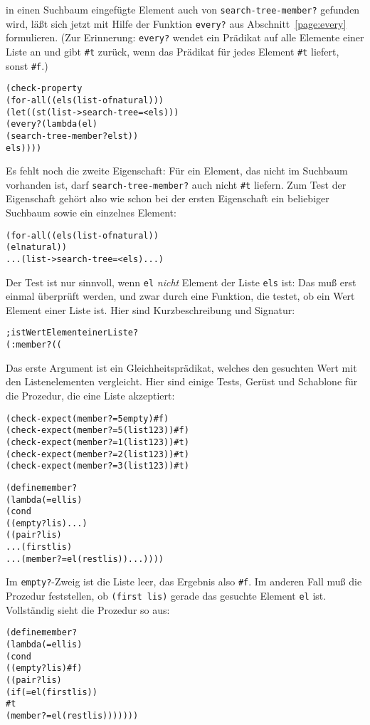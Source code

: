 in einen Suchbaum eingefügte Element auch von
\texttt{search-tree-member?} gefunden wird, läßt sich jetzt mit Hilfe
der Funktion \texttt{every?} aus Abschnitt~\ref{page:every}
formulieren.  (Zur Erinnerung: \texttt{every?} wendet ein Prädikat auf
alle Elemente einer Liste an und gibt \verb|#t| zurück, wenn das
Prädikat für jedes Element \verb|#t| liefert, sonst \verb|#f|.)
%
\begin{alltt}
(check-property
 (for-all ((els (list-of natural)))
   (let ((st (list->search-tree = < els)))
     (every? (lambda (el)
               (search-tree-member? el st))
             els))))
\end{alltt}
%
Es fehlt noch die zweite Eigenschaft: Für ein Element, das nicht im
Suchbaum vorhanden ist, darf \texttt{search-tree-member?} auch nicht
\verb|#t| liefern.  Zum Test der Eigenschaft gehört also wie schon bei
der ersten Eigenschaft ein beliebiger Suchbaum sowie ein einzelnes Element:
%
\begin{alltt}
(for-all ((els (list-of natural))
          (el natural))
  ... (list->search-tree = < els) ...)
\end{alltt}
%
Der Test ist nur sinnvoll, wenn \texttt{el} \emph{nicht} Element der Liste
\texttt{els} ist: Das muß erst einmal überprüft werden, und zwar durch
eine Funktion, die testet, ob ein Wert Element einer Liste ist.  Hier
sind Kurzbeschreibung und Signatur:
%
\begin{alltt}
; ist Wert Element einer Liste?
(: member? ((%a %a -> boolean) %a (list-of %a) -> boolean))
\end{alltt}
%
Das erste Argument ist ein Gleichheitsprädikat, welches den gesuchten
Wert mit den Listenelementen vergleicht.  Hier sind einige Tests,
Gerüst und Schablone für die Prozedur, die eine Liste akzeptiert:
%
\begin{alltt}
(check-expect (member? = 5 empty) #f)
(check-expect (member? = 5 (list 1 2 3)) #f)
(check-expect (member? = 1 (list 1 2 3)) #t)
(check-expect (member? = 2 (list 1 2 3)) #t)
(check-expect (member? = 3 (list 1 2 3)) #t)

(define member?
  (lambda (= el lis)
    (cond
      ((empty? lis) ...)
      ((pair? lis)
       ... (first lis)
       ... (member? = el (rest lis)) ...))))
\end{alltt}
%
Im \texttt{empty?}-Zweig ist die Liste leer, das Ergebnis also
\verb|#f|.  Im anderen Fall muß die Prozedur feststellen, ob
\texttt{(first lis)} gerade das gesuchte Element \texttt{el} ist.
Vollständig sieht die Prozedur so aus:
%
\begin{alltt}
(define member?
  (lambda (= el lis)
    (cond
      ((empty? lis) #f)
      ((pair? lis)
       (if (= el (first lis))
           #t
           (member? = el (rest lis)))))))
\end{alltt}
